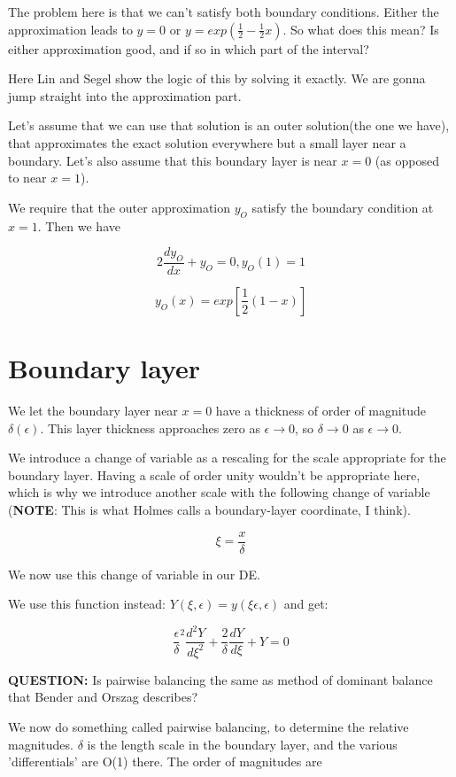 \documentclass[12pt]{report}
\begin{document}
The problem here is that we can't satisfy both boundary
conditions. Either the approximation leads to $y=0$ or $y=exp(\frac 1
2 - \frac 1 2 x)$. So what does this mean? Is either approximation
good, and if so in which part of the interval?

Here Lin and Segel show the logic of this by solving it exactly. We
are gonna jump straight into the approximation part.

Let's assume that we can use that solution is an outer solution(the one
we have), that approximates the exact solution everywhere but a small layer
near a boundary.  Let's also assume that this boundary layer is near $x=0$ (as opposed to near $x=1$).

We require that the outer approximation $y_O$ satisfy the boundary
condition at $x=1$. Then we have

$$2 \frac{dy_O}{dx} + y_O = 0, y_O(1)=1$$

$$y_O(x) = exp[\frac 1 2 (1-x)]$$

\section{Boundary layer}

We let the boundary layer near $x=0$ have a thickness of order of
magnitude $\delta(\epsilon)$. This layer thickness approaches zero as
$\epsilon \to 0$, so $\delta \to 0$ as $\epsilon \to 0$.

We introduce a change of variable as a rescaling for the scale
appropriate for the boundary layer. Having a scale of order unity
wouldn't be appropriate here, which is why we introduce another scale
with the following change of variable (\textbf{NOTE}: This is what Holmes calls a boundary-layer coordinate, I think).

$$\xi = \frac x \delta$$

We now use this change of variable in our DE.

We use this function instead: $Y(\xi, \epsilon) = y(\xi \epsilon,
\epsilon)$ and get:

$$\frac \epsilon \delta^2 \frac{d^2Y}{d\xi^2} + \frac 2 \delta
\frac{dY}{d\xi} + Y = 0$$

\textbf{QUESTION:} Is pairwise balancing the same as method of dominant balance that Bender and Orszag describes?

We now do something called pairwise balancing, to determine the
relative magnitudes. $\delta$ is the length scale in the boundary
layer, and the various 'differentials' are O(1) there. The order of
magnitudes are
\end{document}
